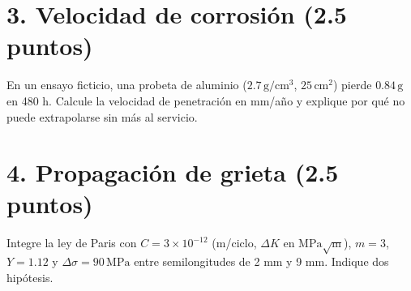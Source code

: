 \section*{3. Velocidad de corrosión (2.5 puntos)}
En un ensayo ficticio, una probeta de aluminio ($2.7\,\mathrm{g/cm^3}$, $25\,\mathrm{cm^2}$) pierde $0.84\,\mathrm g$ en 480 h. Calcule la velocidad de penetración en mm/año y explique por qué no puede extrapolarse sin más al servicio.

\section*{4. Propagación de grieta (2.5 puntos)}
Integre la ley de Paris con $C=3\times10^{-12}$ (m/ciclo, $\Delta K$ en $\mathrm{MPa\sqrt m}$), $m=3$, $Y=1.12$ y $\Delta\sigma=90\,\mathrm{MPa}$ entre semilongitudes de 2 mm y 9 mm. Indique dos hipótesis.
